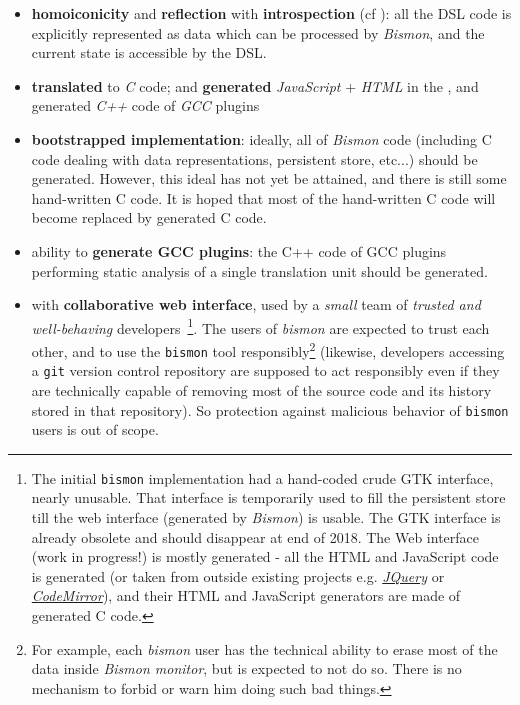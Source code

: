 \begin{itemize}
  \item \textbf{homoiconicity} and \textbf{reflection} with
    \textbf{introspection} (cf \cite{Pitrat:1996:FGCS,
      Pitrat:1990:Metaconnaissances, Pitrat:2009:AST,
      Pitrat:2009:ArtifBeings}): all the DSL code is explicitly
    represented as data which can be processed by \textit{Bismon}, and
    the current state is accessible by the DSL.

    \item \textbf{translated} to \emph{C} code; and \textbf{generated}
      \emph{JavaScript} + \emph{HTML} in the , and generated
      \emph{C++} code of \emph{GCC} plugins

    \item \textbf{bootstrapped implementation}: ideally, all of
      \textit{Bismon} code (including C code dealing with data
      representations, persistent store, etc...) should be
      generated. However, this ideal has not yet be attained, and
      there is still some hand-written C code. It is hoped that most
      of the hand-written C code will become replaced by generated C
      code.
    \item ability to \textbf{generate GCC plugins}: the C++ code of
      GCC plugins performing static analysis of a single translation
      unit should be generated.

    \item with \textbf{collaborative web interface}, used by a
      \emph{small} team of \emph{trusted and well-behaving}
      developers~\footnote{The initial \texttt{bismon} implementation
        had a hand-coded crude GTK interface, nearly unusable. That
        interface is temporarily used to fill the persistent store
        till the web interface (generated by \emph{Bismon}) is
        usable. The GTK interface is already obsolete and should
        disappear at end of 2018. The Web interface (work in
        progress!) is mostly generated - all the HTML and JavaScript
        code is generated (or taken from outside existing projects
        e.g. \href{http://jquery.com/}{\emph{JQuery}} or
        \href{http://codemirror.net/}{\emph{CodeMirror}}), and their
        HTML and JavaScript generators are made of generated C
        code.}. The users of \emph{bismon} are expected to trust each
      other, and to use the \texttt{bismon} tool
      responsibly\footnote{For example, each \emph{bismon} user has
        the technical ability to erase most of the data inside
        \textit{Bismon monitor}, but is expected to not do so. There
        is no mechanism to forbid or warn him doing such bad things.}
      (likewise, developers accessing a \texttt{git} version control
      repository are supposed to act responsibly even if they are
      technically capable of removing most of the source code and its
      history stored in that repository). So protection against
      malicious behavior of \texttt{bismon} users is out of scope.


\end{itemize}
